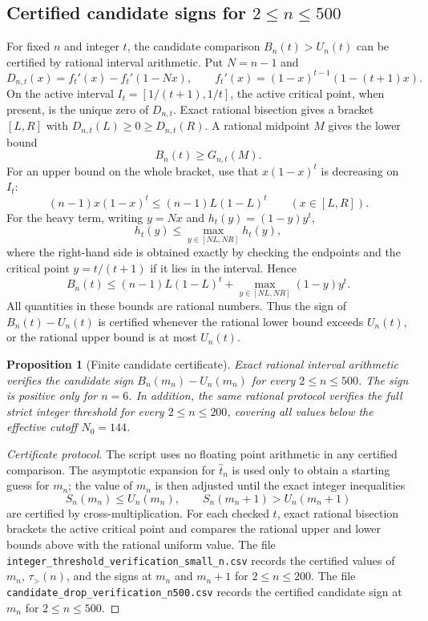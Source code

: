 \documentclass[11pt]{article}
\newtheorem{proposition}[theorem]{Proposition}
\theoremstyle{definition}
\begin{document}
\subsection{Certified candidate signs for \(2\le n\le500\)}

For fixed \(n\) and integer \(t\), the candidate comparison \(B_n(t)>U_n(t)\)
can be certified by rational interval arithmetic.  Put \(N=n-1\) and
\[
  D_{n,t}(x)=f_t'(x)-f_t'(1-Nx),
  \qquad
  f_t'(x)=(1-x)^{t-1}(1-(t+1)x).
\]
On the active interval \(I_t=[1/(t+1),1/t]\), the active critical point, when
present, is the unique zero of \(D_{n,t}\).  Exact rational bisection gives a
bracket \([L,R]\) with \(D_{n,t}(L)\ge0\ge D_{n,t}(R)\).  A rational midpoint
\(M\) gives the lower bound
\[
  B_n(t)\ge G_{n,t}(M).
\]
For an upper bound on the whole bracket, use that \(x(1-x)^t\) is decreasing on
\(I_t\):
\[
  (n-1)x(1-x)^t\le (n-1)L(1-L)^t\qquad (x\in[L,R]).
\]
For the heavy term, writing \(y=Nx\) and \(h_t(y)=(1-y)y^t\),
\[
  h_t(y)\le \max_{y\in[NL,NR]}h_t(y),
\]
where the right-hand side is obtained exactly by checking the endpoints and the
critical point \(y=t/(t+1)\) if it lies in the interval.  Hence
\[
  B_n(t)
  \le
  (n-1)L(1-L)^t+
  \max_{y\in[NL,NR]}(1-y)y^t.
\]
All quantities in these bounds are rational numbers.  Thus the sign of
\(B_n(t)-U_n(t)\) is certified whenever the rational lower bound exceeds
\(U_n(t)\), or the rational upper bound is at most \(U_n(t)\).

\begin{proposition}[Finite candidate certificate]\label{prop:finite-certificate-500}
Exact rational interval arithmetic verifies the candidate sign
\(B_n(m_n)-U_n(m_n)\) for every \(2\le n\le500\).  The sign is positive only for
\(n=6\).  In addition, the same rational protocol verifies the full strict
integer threshold for every \(2\le n\le200\), covering all values below the
effective cutoff \(N_0=144\).
\end{proposition}

\begin{proof}[Certificate protocol]
The script uses no floating point arithmetic in any certified comparison.  The
asymptotic expansion for \(\widehat t_n\) is used only to obtain a starting
guess for \(m_n\); the value of \(m_n\) is then adjusted until the exact integer
inequalities
\[
  S_n(m_n)\le U_n(m_n),
  \qquad
  S_n(m_n+1)>U_n(m_n+1)
\]
are certified by cross-multiplication.  For each checked \(t\), exact rational
bisection brackets the active critical point and compares the rational upper and
lower bounds above with the rational uniform value.  The file
\texttt{integer\_threshold\_verification\_small\_n.csv} records the certified
values of \(m_n\), \(\tau_>(n)\), and the signs at \(m_n\) and \(m_n+1\) for
\(2\le n\le200\).  The file
\texttt{candidate\_drop\_verification\_n500.csv} records the certified candidate
sign at \(m_n\) for \(2\le n\le500\).
\end{proof}
\end{document}
